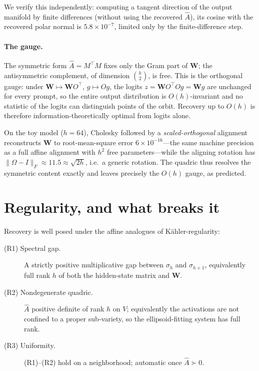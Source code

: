 \documentclass[11pt]{article}
\newcommand{\W}{\mathbf{W}}
\newcommand{\hidden}{g}
\newcommand{\Ahat}{\hat{A}}
\begin{document}
We verify this independently: computing a tangent direction of the output
manifold by finite differences (without using the recovered $\Ahat$), its cosine
with the recovered polar normal is $5.8\times10^{-7}$, limited only by the
finite-difference step.

\paragraph{The gauge.} The symmetric form $\Ahat=M^\top M$ fixes only the Gram
part of $\W$; the antisymmetric complement, of dimension $\binom{h}{2}$, is free.
This is the orthogonal gauge: under $\W\mapsto\W O^\top$, $\hidden\mapsto
O\hidden$, the logits $z=\W O^\top O\hidden=\W\hidden$ are unchanged for every
prompt, so the entire output distribution is $O(h)$-invariant and no statistic of
the logits can distinguish points of the orbit. Recovery up to $O(h)$ is
therefore information-theoretically optimal from logits alone.

On the toy model ($h=64$), Cholesky followed by a \emph{scaled-orthogonal}
alignment reconstructs $\W$ to root-mean-square error $6\times10^{-16}$---the
same machine precision as a full affine alignment with $h^2$ free
parameters---while the aligning rotation has $\|\Omega-I\|_F\approx 11.5\approx
\sqrt{2h}$, i.e.\ a generic rotation. The quadric thus resolves the symmetric
content exactly and leaves precisely the $O(h)$ gauge, as predicted.

\section{Regularity, and what breaks it}\label{sec:reg}

Recovery is well posed under the affine analogues of K\"ahler-regularity:

\begin{description}
\item[(R1) Spectral gap.] A strictly positive multiplicative gap between
$\sigma_h$ and $\sigma_{h+1}$, equivalently full rank $h$ of both the
hidden-state matrix and $\W$.
\item[(R2) Nondegenerate quadric.] $\Ahat$ positive definite of rank $h$ on $V$;
equivalently the activations are not confined to a proper sub-variety, so the
ellipsoid-fitting system has full rank.
\item[(R3) Uniformity.] (R1)--(R2) hold on a neighborhood; automatic once
$\Ahat\succ0$.
\end{description}
\end{document}
